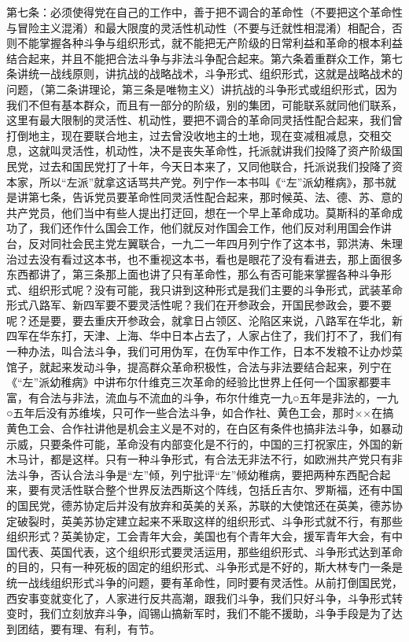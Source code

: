 第七条：必须使得党在自己的工作中，善于把不调合的革命性（不要把这个革命性与冒险主义混淆）和最大限度的灵活性机动性（不要与迁就性相混淆）相配合，否则不能掌握各种斗争与组织形式，就不能把无产阶级的日常利益和革命的根本利益结合起来，并且不能把合法斗争与非法斗争配合起来。第六条着重群众工作，第七条讲统一战线原则，讲抗战的战略战术，斗争形式、组织形式，这就是战略战术的问题，（第二条讲理论，第三条是唯物主义）讲抗战的斗争形式或组织形式，因为我们不但有基本群众，而且有一部分的阶级，别的集团，可能联系就同他们联系，这里有最大限制的灵活性、机动性，要把不调合的革命同灵括性配合起来，我们曾打倒地主，现在要联合地主，过去曾没收地主的土地，现在变减租减息，交租交息，这就叫灵活性，机动性，决不是丧失革命性，托派就讲我们投降了资产阶级国民党，过去和国民党打了十年，今天日本来了，又同他联合，托派说我们投降了资本家，所以“左派”就拿这话骂共产党。列宁作一本书叫《“左”派幼稚病》，那书就是讲第七条，告诉党员要革命性同灵活性配合起来，那时候英、法、德、苏、意的共产党员，他们当中有些人提出打迂回，想在一个早上革命成功。莫斯科的革命成功了，我们还作什么国会工作，他们就反对作国会工作，他们反对利用国会作讲台，反对同社会民主党左翼联合，一九二一年四月列宁作了这本书，郭洪涛、朱理治过去没有看过这本书，也不重视这本书，看也是眼花了没有看进去，那上面很多东西都讲了，第三条那上面也讲了只有革命性，那么有否可能来掌握各种斗争形式、组织形式呢？没有可能，我只讲到这种形式是我们主要的斗争形式，武装革命形式八路军、新四军要不要灵活性呢？我们在开参政会，开国民参政会，要不要呢？还是要，要去重庆开参政会，就拿日占领区、沦陷区来说，八路军在华北，新四军在华东打，天津、上海、华中日本占去了，人家占住了，我们打不了，我们有一种办法，叫合法斗争，我们可用伪军，在伪军中作工作，日本不发粮不让办炒菜馆子，就起来发动斗争，提高群众革命积极性，合法与非法要结合起来，列宁在《“左”派幼稚病》中讲布尔什维克三次革命的经验比世界上任何一个国家都要丰富，有合法与非法，流血与不流血的斗争，布尔什维克一九○五年是非法的，一九○五年后没有苏维埃，只可作一些合法斗争，如合作社、黄色工会，那时××在搞黄色工会、合作社讲他是机会主义是不对的，在白区有条件也搞非法斗争，如暴动示威，只要条件可能，革命没有内部变化是不行的，中国的三打祝家庄，外国的新木马计，都是这样。只有一种斗争形式，有合法无非法不行，如欧洲共产党只有非法斗争，否认合法斗争是“左”倾，列宁批评“左”倾幼稚病，要把两种东西配合起来，要有灵活性联合整个世界反法西斯这个阵线，包括丘吉尔、罗斯福，还有中国的国民党，德苏协定后并没有放弃和英美的关系，苏联的大使馆还在英美，德苏协定破裂时，英美苏协定建立起来不釆取这样的组织形式、斗争形式就不行，有那些组织形式？英美协定，工会青年大会，美国也有个青年大会，援军青年大会，有中国代表、英国代表，这个组织形式要灵活运用，那些组织形式、斗争形式达到革命的目的，只有一种死板的固定的组织形式、斗争形式是不好的，斯大林专门一条是统一战线组织形式斗争的问题，要有革命性，同时要有灵活性。从前打倒国民党，西安事变就变化了，人家进行反共高潮，跟我们斗争，我们只好斗争，斗争形式转变时，我们立刻放弃斗争，阎锡山搞新军时，我们不能不援助，斗争手段是为了达到团结，要有理、有利，有节。

